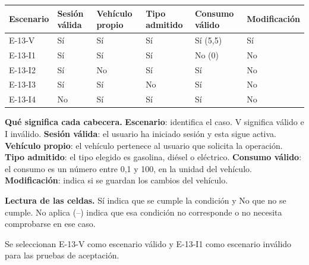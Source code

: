 \begingroup\fontsize{7.8}{11}\selectfont\setlength{\tabcolsep}{3pt}
\begin{tabularx}{\linewidth}{@{}*{6}{Y}@{}}\toprule
\textbf{Escenario} & \textbf{Sesión válida} & \textbf{Vehículo propio} & \textbf{Tipo admitido} & \textbf{Consumo válido} & \textbf{Modificación}\\\midrule
E-13-V & Sí & Sí & Sí & Sí (5,5) & Sí\\[3pt]
E-13-I1 & Sí & Sí & Sí & No (0) & No\\[3pt]
E-13-I2 & Sí & No & Sí & Sí & No\\[3pt]
E-13-I3 & Sí & Sí & No & Sí & No\\[3pt]
E-13-I4 & No & Sí & Sí & Sí & No\\[3pt]
\bottomrule\end{tabularx}\endgroup\par
{\fontsize{9}{11}\selectfont\textbf{Qué significa cada cabecera.} \textbf{Escenario}: identifica el caso. V significa válido e I inválido. \textbf{Sesión válida}: el usuario ha iniciado sesión y esta sigue activa. \textbf{Vehículo propio}: el vehículo pertenece al usuario que solicita la operación. \textbf{Tipo admitido}: el tipo elegido es gasolina, diésel o eléctrico. \textbf{Consumo válido}: el consumo es un número entre 0,1 y 100, en la unidad del vehículo. \textbf{Modificación}: indica si se guardan los cambios del vehículo.\par\textbf{Lectura de las celdas.} Sí indica que se cumple la condición y No que no se cumple. No aplica (--) indica que esa condición no corresponde o no necesita comprobarse en ese caso.\par}


Se seleccionan E-13-V como escenario válido y E-13-I1 como escenario inválido para las pruebas de aceptación.\par


